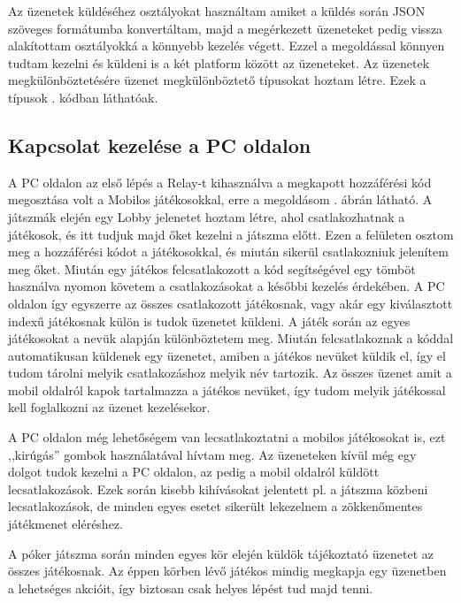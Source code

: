 \documentclass[]{thesis-ekf}
\theoremstyle{definition}
\theoremstyle{remark}
\begin{document}
Az üzenetek küldéséhez osztályokat használtam amiket a küldés során JSON szöveges formátumba konvertáltam, majd a megérkezett üzeneteket pedig vissza alakítottam osztályokká a könnyebb kezelés végett. Ezzel a megoldással könnyen tudtam kezelni és küldeni is a két platform között az üzeneteket. Az üzenetek megkülönböztetésére üzenet megkülönböztető típusokat hoztam létre. Ezek a típusok . kódban láthatóak.



\subsection{Kapcsolat kezelése a PC oldalon}

A PC oldalon az első lépés a Relay-t kihasználva a megkapott hozzáférési kód megosztása volt a Mobilos játékosokkal, erre a megoldásom . ábrán látható. A játszmák elején egy Lobby jelenetet hoztam létre, ahol csatlakozhatnak a játékosok, és itt tudjuk majd őket kezelni a játszma előtt. Ezen a felületen osztom meg a hozzáférési kódot a játékosokkal, és miután sikerül csatlakozniuk jelenítem meg őket. Miután egy játékos felcsatlakozott a kód segítségével egy tömböt használva nyomon követem a csatlakozásokat a későbbi kezelés érdekében. A PC oldalon így egyszerre az összes csatlakozott játékosnak, vagy akár egy kiválasztott indexű játékosnak külön is tudok üzenetet küldeni. A játék során az egyes játékosokat a nevük alapján különböztetem meg. Miután felcsatlakoznak a kóddal automatikusan küldenek egy üzenetet, amiben a játékos nevüket küldik el, így el tudom tárolni melyik csatlakozáshoz melyik név tartozik. Az összes üzenet amit a mobil oldalról kapok tartalmazza a játékos nevüket, így tudom melyik játékossal kell foglalkozni az üzenet kezelésekor. 

A PC oldalon még lehetőségem van lecsatlakoztatni a mobilos játékosokat is, ezt ,,kirúgás'' gombok használatával hívtam meg. Az üzeneteken kívül még egy dolgot tudok kezelni a PC oldalon, az pedig a mobil oldalról küldött lecsatlakozások. Ezek során kisebb kihívásokat jelentett pl. a játszma közbeni lecsatlakozások, de minden egyes esetet sikerült lekezelnem a zökkenőmentes játékmenet eléréshez.

A póker játszma során minden egyes kör elején küldök tájékoztató üzenetet az összes játékosnak. Az éppen körben lévő játékos mindig megkapja egy üzenetben a lehetséges akcióit, így biztosan csak helyes lépést tud majd tenni.
\end{document}
